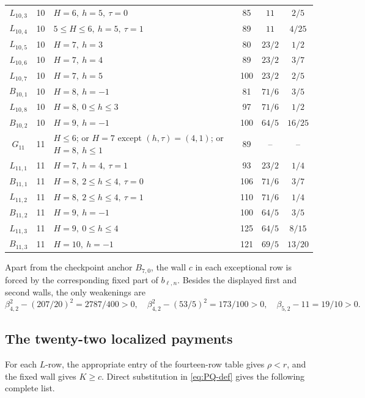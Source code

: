 \documentclass[11pt]{article}
\begin{document}
\begin{longtable}{@{}c c L{6.0cm} c c c@{}}
\(L_{10,3}\)&10&\(H=6,\ h=5,\ \tau=0\)&85&\(11\)&\(2/5\)\\
\(L_{10,4}\)&10&\(5\leq H\leq6,\ h=5,\ \tau=1\)&89&\(11\)&\(4/25\)\\
\(L_{10,5}\)&10&\(H=7,\ h=3\)&80&\(23/2\)&\(1/2\)\\
\(L_{10,6}\)&10&\(H=7,\ h=4\)&89&\(23/2\)&\(3/7\)\\
\(L_{10,7}\)&10&\(H=7,\ h=5\)&100&\(23/2\)&\(2/5\)\\
\(B_{10,1}\)&10&\(H=8,\ h=-1\)&81&\(71/6\)&\(3/5\)\\
\(L_{10,8}\)&10&\(H=8,\ 0\leq h\leq3\)&97&\(71/6\)&\(1/2\)\\
\(B_{10,2}\)&10&\(H=9,\ h=-1\)&100&\(64/5\)&\(16/25\)\\ \midrule
\(G_{11}\)&11&\(H\leq6\); or \(H=7\) except \((h,\tau)=(4,1)\); or
\(H=8,\ h\leq1\)&89&--&--\\
\(L_{11,1}\)&11&\(H=7,\ h=4,\ \tau=1\)&93&\(23/2\)&\(1/4\)\\
\(B_{11,1}\)&11&\(H=8,\ 2\leq h\leq4,\ \tau=0\)&106&\(71/6\)&\(3/7\)\\
\(L_{11,2}\)&11&\(H=8,\ 2\leq h\leq4,\ \tau=1\)&110&\(71/6\)&\(1/4\)\\
\(B_{11,2}\)&11&\(H=9,\ h=-1\)&100&\(64/5\)&\(3/5\)\\
\(L_{11,3}\)&11&\(H=9,\ 0\leq h\leq4\)&125&\(64/5\)&\(8/15\)\\
\(B_{11,3}\)&11&\(H=10,\ h=-1\)&121&\(69/5\)&\(13/20\)\\
\bottomrule
\end{longtable}
\endgroup

Apart from the checkpoint anchor \(B_{7,0}\), the wall \(c\) in each
exceptional row is forced by the corresponding fixed part of
\(b_{\ell,n}\).  Besides the displayed first and second walls, the only
weakenings are
\[
 \beta_{4,2}^2-(207/20)^2=2787/400>0,
 \quad
 \beta_{4,2}^2-(53/5)^2=173/100>0,
 \quad
 \beta_{5,2}-11=19/10>0.
\]

\subsection{The twenty-two localized payments}

For each \(L\)-row, the appropriate entry of the fourteen-row table gives
\(\rho<r\), and the fixed wall gives \(K\geq c\).  Direct substitution in
\eqref{eq:PQ-def} gives the following complete list.
\end{document}
